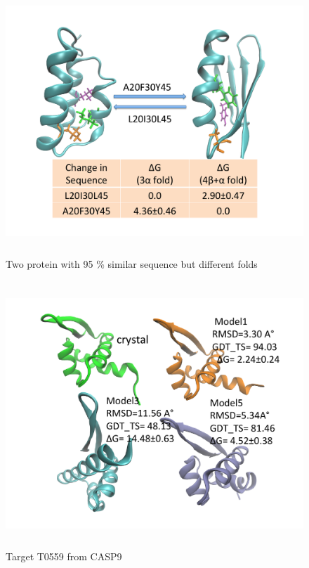 \documentclass[12pt]{article}
\begin{document}
\begin{figure}
\begin{center}
\includegraphics[width=12cm,height=10cm]{G95.pdf}
\end{center}
\caption{Two protein with 95 \% similar sequence but different folds}
\label{fig:G95}
\end{figure}

\begin{figure}
\begin{center}
\includegraphics[width=12cm,height=10cm]{T0559.pdf}
\end{center}
\caption{Target T0559 from CASP9}
\label{fig:T0559}
\end{figure}
\end{document}

